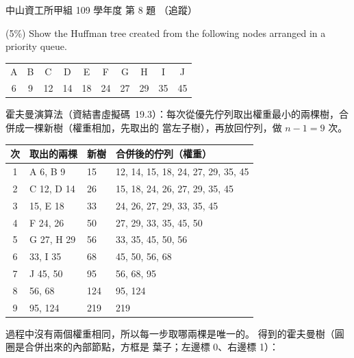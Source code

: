 \begin{pastexam}[label={px:nsysu-109-osds-02}]{中山資工所甲組 109 學年度 第 8 題}
（追蹤）

(5\%) Show the Huffman tree created from the following nodes arranged in a priority queue.
\begin{center}
\begin{tabular}{|c|c|c|c|c|c|c|c|c|c|}\hline
A & B & C & D & E & F & G & H & I & J\\
6 & 9 & 12 & 14 & 18 & 24 & 27 & 29 & 35 & 45\\\hline
\end{tabular}
\end{center}
\end{pastexam}

\begin{pastsoln}
霍夫曼演算法（資結書虛擬碼~19.3）：每次從優先佇列取出權重最小的兩棵樹，合併成一棵新樹（權重相加，先取出的
當左子樹），再放回佇列，做 $n - 1 = 9$ 次。
\begin{center}
\begin{tabular}{clll}
\toprule
次 & 取出的兩棵 & 新樹 & 合併後的佇列（權重） \\
\midrule
1 & A 6, B 9 & 15 & 12, 14, 15, 18, 24, 27, 29, 35, 45 \\
2 & C 12, D 14 & 26 & 15, 18, 24, 26, 27, 29, 35, 45 \\
3 & 15, E 18 & 33 & 24, 26, 27, 29, 33, 35, 45 \\
4 & F 24, 26 & 50 & 27, 29, 33, 35, 45, 50 \\
5 & G 27, H 29 & 56 & 33, 35, 45, 50, 56 \\
6 & 33, I 35 & 68 & 45, 50, 56, 68 \\
7 & J 45, 50 & 95 & 56, 68, 95 \\
8 & 56, 68 & 124 & 95, 124 \\
9 & 95, 124 & 219 & 219 \\
\bottomrule
\end{tabular}
\end{center}
過程中沒有兩個權重相同，所以每一步取哪兩棵是唯一的。 得到的霍夫曼樹（圓圈是合併出來的內部節點，方框是
葉子；左邊標 0、右邊標 1）：
\begin{center}
\end{center}
\end{pastsoln}
